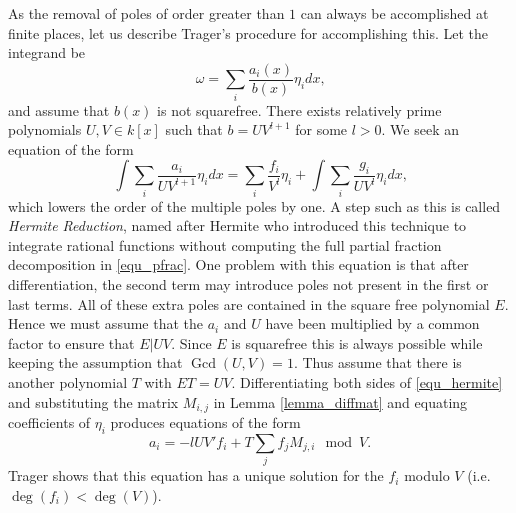 \documentclass[12pt,reqno]{amsart}
\numberwithin{equation}{section}
\begin{document}
As the removal of poles of order greater than $1$ can always be accomplished at finite places, let us describe Trager's procedure for accomplishing this. Let the integrand be
\begin{equation*}
 \omega = \sum_i \frac{a_i(x)}{b(x)} \eta_i dx\text{,}
\end{equation*}
and assume that $b(x)$ is not squarefree. There exists relatively prime polynomials $U,V \in k[x]$ such that $b=U V^{l+1}$ for some $l>0$. We seek an equation of the form
\begin{equation}
\label{equ_hermite}
\int \sum_{i} \frac{a_i}{U V^{l+1}} \eta_i dx = \sum_{i} \frac{f_i}{V^l} \eta_i + \int \sum_{i} \frac{g_i}{U V^l} \eta_i dx\text{,}
\end{equation}
which lowers the order of the multiple poles by one. A step such as this is called \emph{Hermite Reduction}, named after Hermite \cite{hermite} who introduced this technique to integrate rational functions without computing the full partial fraction decomposition in \eqref{equ_pfrac}. One problem with this equation is that after differentiation, the second term may introduce poles not present in the first or last terms. All of these extra poles are contained in the square free polynomial $E$. Hence we must assume that the $a_i$ and $U$ have been multiplied by a common factor to ensure that $E|UV$. Since $E$ is squarefree this is always possible while keeping the assumption that $\operatorname{Gcd}(U,V)=1$. Thus assume that there is another polynomial $T$ with $ET=UV$. Differentiating both sides of \eqref{equ_hermite} and substituting the matrix $M_{i,j}$ in Lemma \ref{lemma_diffmat} and equating coefficients of $\eta_i$ produces equations of the form
\begin{equation*}
 a_i = -l U V' f_i+T\sum_{j} f_j M_{j,i} \mod V\text{.}
\end{equation*}
Trager shows that this equation has a unique solution for the $f_i$ modulo $V$ (i.e. $\operatorname{deg}(f_i) < \operatorname{deg}(V)$).
\end{document}
